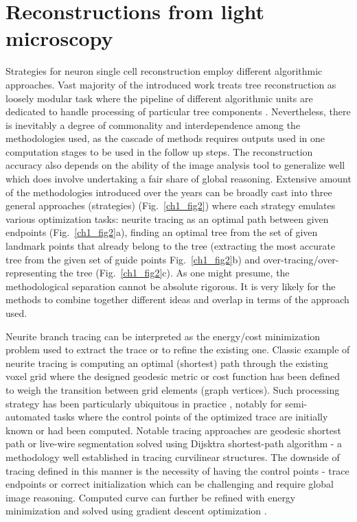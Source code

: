 \section{Reconstructions from light microscopy}
Strategies for neuron single cell reconstruction employ different algorithmic approaches. Vast majority of the introduced work treats tree reconstruction as loosely modular task where the pipeline of different algorithmic units are dedicated to handle processing of particular tree components \cite{meijering2010neuron}. Nevertheless, there is inevitably a degree of commonality and interdependence among the methodologies used, as the cascade of methods requires outputs used in one computation stages to be used in the follow up steps. The reconstruction accuracy also depends on the ability of the image analysis tool to generalize well which does involve undertaking a fair share of global reasoning. Extensive amount of the methodologies introduced over the years \cite{meijering2010neuron,donohue2011automated,acciai2016automated} can be broadly cast into three general approaches (strategies) (Fig.~\ref{ch1_fig2}) where each strategy emulates various optimization tasks: neurite tracing as an optimal path between given endpoints (Fig.~\ref{ch1_fig2}a), finding an optimal tree from the set of given landmark points that already belong to the tree (extracting the most accurate tree from the given set of guide points Fig.~\ref{ch1_fig2}b) and over-tracing/over-representing the tree (Fig.~\ref{ch1_fig2}c). As one might presume, the methodological separation cannot be absolute rigorous. It is very likely for the methods to combine together different ideas and overlap in terms of the approach used.

Neurite branch tracing can be interpreted as the energy/cost minimization problem \cite{meijering2004design,peng2010automatic} used to extract the trace or to refine the existing one. Classic example of neurite tracing is computing an optimal (shortest) path through the existing voxel grid where the designed geodesic metric or cost function has been defined to weigh the transition between grid elements (graph vertices). Such processing strategy has been particularly ubiquitous in practice \cite{meijering2004design,peng2010v3d,longair2011simple}, notably for semi-automated tasks where the control points of the optimized trace are initially known or had been computed. Notable tracing approaches are geodesic shortest path \cite{peng2010automatic} or live-wire segmentation \cite{meijering2004design} solved using Dijsktra shortest-path algorithm \cite{dijkstra1959note} - a methodology well established in tracing curvilinear structures. The downside of tracing defined in this manner is the necessity of having the control points - trace endpoints or correct initialization which can be challenging and require global image reasoning. Computed curve can further be refined with energy minimization and solved using gradient descent optimization \cite{peng2007straightening,peng2010automatic}. 

